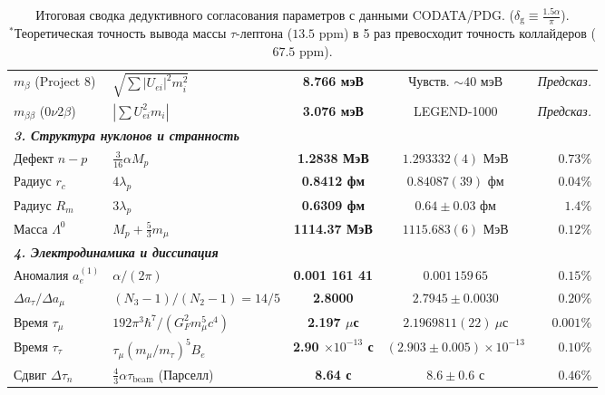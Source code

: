 \documentclass[12pt,a4paper]{article}
\begin{document}
\begin{table}[h!]
\begin{tabularx}{\textwidth}{l p{4.2cm} c c r}
			$m_\beta$ (Project 8) & $\sqrt{\sum |U_{ei}|^2 m_i^2}$ & \textbf{8.766 мэВ} & Чувств. $\sim 40$ мэВ & \textit{Предсказ.} \\
			$m_{\beta\beta}$ ($0\nu 2\beta$) & $|\sum U_{ei}^2 m_i|$ & \textbf{3.076 мэВ} & LEGEND-1000 & \textit{Предсказ.} \\
			\midrule
			\multicolumn{5}{l}{\textit{\textbf{3. Структура нуклонов и странность}}} \\
			Дефект $n - p$ & $\frac{3}{16}\alpha M_p$ & \textbf{1.2838 МэВ} & $1.293332(4)$ МэВ & $\mathbf{0.73\%}$ \\
			Радиус $r_c$ & $4 \lambda_p$ & \textbf{0.8412 фм} & $0.84087(39)$ фм & $\mathbf{0.04\%}$ \\
			Радиус $R_m$ & $3 \lambda_p$ & \textbf{0.6309 фм} & $0.64 \pm 0.03$ фм & $\mathbf{1.4\%}$ \\
			Масса $\Lambda^0$ & $M_p + \frac{5}{3}m_\mu$ & \textbf{1114.37 МэВ} & $1115.683(6)$ МэВ & $\mathbf{0.12\%}$ \\
			\midrule
			\multicolumn{5}{l}{\textit{\textbf{4. Электродинамика и диссипация}}} \\
			Аномалия $a_e^{(1)}$ & $\alpha / (2\pi)$ & \textbf{0.001 161 41} & $0.001\,159\,65$ & $\mathbf{0.15\%}$ \\
			$\Delta a_\tau / \Delta a_\mu$ & $(N_3 - 1)/(N_2 - 1) = 14/5$ & \textbf{2.8000} & $2.7945 \pm 0.0030$ & $\mathbf{0.20\%}$ \\
			Время $\tau_\mu$ & $192\pi^3\hbar^7 / (G_F^2 m_\mu^5 c^4)$ & \textbf{2.197 $\mu$с} & $2.1969811(22) \ \mu$с & $\mathbf{0.001\%}$ \\
			Время $\tau_\tau$ & $\tau_\mu (m_\mu/m_\tau)^5 B_e$ & \textbf{2.90 $\times 10^{-13}$ с} & $(2.903 \pm 0.005) \times 10^{-13}$ & $\mathbf{0.10\%}$ \\
			Сдвиг $\Delta\tau_n$ & $\frac{4}{3}\alpha \tau_{\text{beam}}$ (Парселл) & \textbf{8.64 с} & $8.6 \pm 0.6$ с & $\mathbf{0.46\%}$ \\
			\bottomrule
		\end{tabularx}
		\caption{Итоговая сводка дедуктивного согласования параметров с данными CODATA/PDG. ($\delta_{\text{g}} \equiv \frac{1.5\alpha}{\pi}$).\\
			$^*$Теоретическая точность вывода массы $\tau$-лептона ($13.5$ ppm) в 5 раз превосходит точность коллайдеров ($67.5$ ppm).}
		\label{tab:final_summary}
	\end{table}
	
	
	
\end{document}
